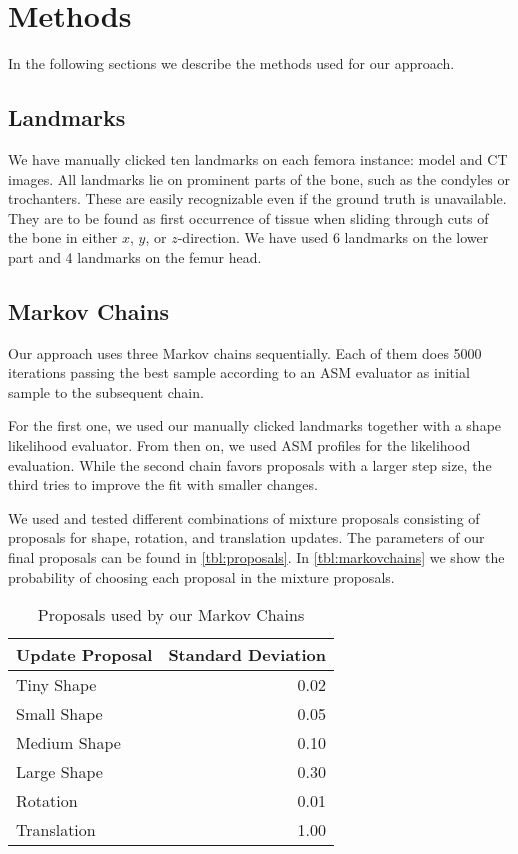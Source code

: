 \section{Methods}
\label{sec:methods}

In the following sections we describe the methods used for our approach.


\subsection{Landmarks}
\label{subsec:landmarks}

We have manually clicked ten landmarks on each femora instance: model and CT images.
All landmarks lie on prominent parts of the bone, such as the condyles or trochanters.
These are easily recognizable even if the ground truth is unavailable.
They are to be found as first occurrence of tissue when sliding through cuts of the bone in either $x$, $y$, or $z$-direction. 
We have used 6 landmarks on the lower part and 4 landmarks on the femur head.


\subsection{Markov Chains}
\label{subsec:markovchains}

Our approach uses three Markov chains sequentially. 
Each of them does 5000 iterations passing the best sample according to an ASM evaluator as initial sample to the subsequent chain.

For the first one, we used our manually clicked landmarks together with a shape likelihood evaluator.
From then on, we used ASM profiles for the likelihood evaluation.
While the second chain favors proposals with a larger step size, the third tries to improve the fit with smaller changes.

We used and tested different combinations of mixture proposals consisting of proposals for shape, rotation, and translation updates. 
The parameters of our final proposals can be found in \autoref{tbl:proposals}. 
In \autoref{tbl:markovchains} we show the probability of choosing each proposal in the mixture proposals.

\begin{table}
  \centering
  \caption{Proposals used by our Markov Chains}
  \label{tbl:proposals}
  \begin{tabular}{lr}
    \toprule
      \textbf{Update Proposal} &
      Standard Deviation \\
    \midrule
      Tiny Shape & 0.02 \\
      Small Shape & 0.05 \\
      Medium Shape & 0.10 \\
      Large Shape & 0.30 \\
      Rotation & 0.01 \\
      Translation & 1.00 \\
    \bottomrule
  \end{tabular}
\end{table}

